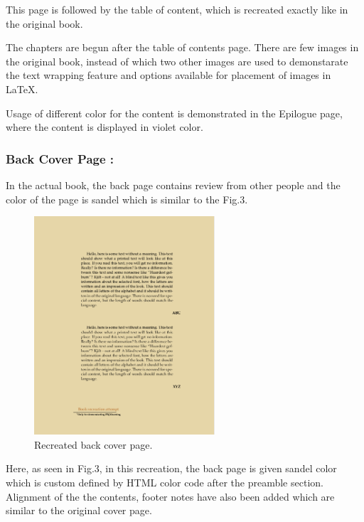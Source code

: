 \documentclass[runningheads]{llncs}
\begin{document}
This page is followed by the table of content, which is recreated exactly like in the original book.

The chapters are begun after the table of contents page. There are few images in the original book, instead of which two other images are used to demonstarate the text wrapping feature and options available for placement of images in \LaTeX. 

Usage of different color for the content is demonstrated in the Epilogue page, where the content is displayed in violet color.


\subsubsection{Back Cover Page : }
In the actual book, the back page contains review from other people and the color of the page is sandel which is similar to the Fig.3. 

\begin{figure}[H]
    \centering
    \includegraphics[width=0.6\textwidth]{BackPage.jpg}
    \caption{Recreated back cover page.}
\end{figure}

Here, as seen in Fig.3, in this recreation, the back page is given sandel color which is custom defined by HTML color code after the preamble section. Alignment of the the contents, footer notes have also been added which are similar to the original cover page.

\end{document}

